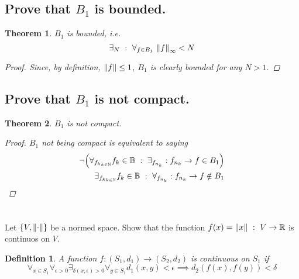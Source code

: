 \documentclass[]{article}
\newcommand{\R}{\mathbb{R}}
\newcommand{\N}{\mathbb{N}}
\newcommand{\st}{\ : \ }
\newtheorem{definition}{Definition}
\newtheorem{theorem}{Theorem}
\begin{document}
\subsection{Prove that $B_1$ is bounded.}

\begin{theorem}
    $B_1$ is bounded, i.e.
    \[\exists_{N} \st \forall_{f \in B_1} \ \norm{f}_\infty < N\]
    \begin{proof}
        Since, by definition, $\norm{f} \leq 1$, $B_1$ is clearly bounded for any $N > 1$.
    \end{proof}
\end{theorem}

\subsection{Prove that $B_1$ is not compact.}

\begin{theorem}
    $B_1$ is not compact.
    \begin{proof}
        $B_1$ not being compact is equivalent to saying
        \begin{align*}
            \lnot \qty(\forall_{{f_k}_{k\in \N}} f_k \in \mathbb{B} \st \exists_{{f_{n_k}}} : f_{n_k} \to f \in B_1)\\
            \exists_{{f_k}_{k\in \N}} f_k \in \mathbb{B} \st \forall_{{f_{n_k}}} : f_{n_k} \to f \notin B_1
        \end{align*}
    \end{proof}
\end{theorem}



\newpage
\section{}
Let $\{V, \norm{\cdot}\}$ be a normed space.
Show that the function $f(x) = \norm{x} \st V \to \R$ is continuos on $V$.

\begin{definition}
    A function $f : (S_1,d_1) \to (S_2,d_2)$ is continuous on $S_1$ if 
    \[
        \forall_{x\in S_1} \forall_{\epsilon>0} \exists_{\delta(x,\epsilon)>0} \forall_{y\in S_1} d_1(x,y) < \epsilon \implies d_2(f(x),f(y)) < \delta
    \]
\end{definition}
\end{document}
